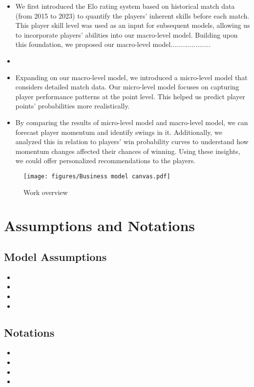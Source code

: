 \documentclass{mcmthesis}
\begin{document}
\begin{itemize}
\item We first introduced the Elo rating system based on historical match data (from 2015 to 2023) to quantify the players' inherent %
skills before each match. This player skill level was used as an input for subsequent models, allowing us to incorporate players' %
abilities into our macro-level model. Building upon this foundation, we proposed our macro-level model.....................

\item
\item Expanding on our macro-level model, we introduced a micro-level model that considers detailed match data. %
Our micro-level model focuses on capturing player performance patterns at the point level. This helped us predict %
player points' probabilities more realistically. %
\item By comparing the results of micro-level model and macro-level model, we can forecast player momentum and identify swings in it. %
Additionally, we analyzed this in relation to players' win probability curves to understand how momentum changes %
affected their chances of winning. Using these insights, we could offer personalized recommendations to the players.
\end{itemize}

\begin{figure}[]
\centering
\texttt{[image: figures/Business model canvas.pdf]}
\caption{Work overview}
\label{fig:businessmodelcanvas}
\end{figure}

\section{Assumptions and Notations}

\subsection{Model Assumptions}
\begin{itemize}
\item
\item
\item
\item
\end{itemize}


\subsection{Notations}
\begin{itemize}
\item
\item
\item
\item
\end{itemize}
\end{document}
